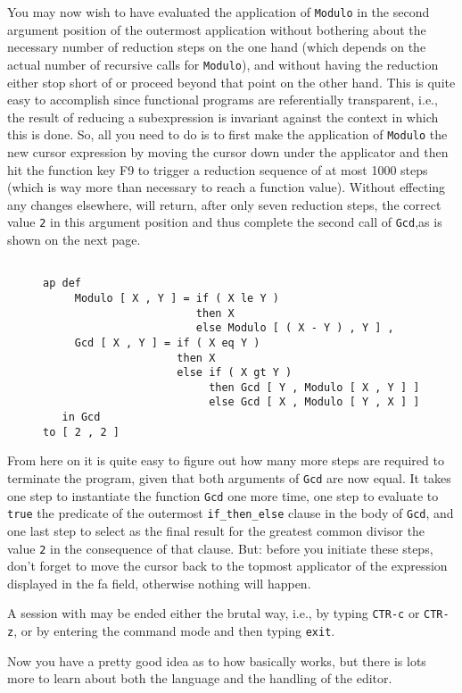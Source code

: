 You  may now wish to have evaluated 
the application of {\tt Modulo} in the second argument
position of the outermost application without bothering about the necessary
number of
reduction steps on the one hand (which depends on the actual number of
recursive calls for {\tt Modulo}), and without
having the reduction either stop short of or proceed beyond that point on the
other hand. This is quite easy to accomplish since functional programs are {\mys referentially 
transparent}, i.e., the result of reducing a subexpression
is invariant against the context in which this is done. So, all you need
to do is to first make the application of {\tt Modulo} the new cursor
expression by moving the cursor down under the applicator and then  hit
the function key F9 to trigger a reduction sequence of at most 1000 steps 
(which is way more than necessary to reach a function value). Without
effecting any changes elsewhere,
\pired will return, after only seven reduction steps, the correct value {\tt 2} in
 this argument position and thus complete the second call of {\tt Gcd},as is shown on the next page.

\begin{figure}
\begin{verbatim}

ap def 
     Modulo [ X , Y ] = if ( X le Y )
                        then X
                        else Modulo [ ( X - Y ) , Y ] ,
     Gcd [ X , Y ] = if ( X eq Y )
                     then X
                     else if ( X gt Y )
                          then Gcd [ Y , Modulo [ X , Y ] ]
                          else Gcd [ X , Modulo [ Y , X ] ]
   in Gcd
to [ 2 , 2 ]

\end{verbatim}
\end{figure}
From here on it is quite easy to figure out how many more steps are
required to terminate the program, given that both arguments of
{\tt Gcd} are now equal. It takes one step to instantiate
 the function {\tt Gcd}  one more time, one step to evaluate to {\tt true}
the predicate of the outermost {\tt if\_then\_else} clause in the body of
{\tt Gcd}, and one last step to select as the final result for the greatest
common divisor the value {\tt 2} in the consequence of that clause.
But: before you initiate these steps, don't forget to move the cursor
back to the topmost applicator of
 the expression displayed in the {\sc fa} field, otherwise nothing will happen.

 A session with \pired may be ended either the brutal way, i.e., by typing
{\tt CTR-c} or {\tt CTR-z}, or by entering the command mode and
 then typing {\tt exit}.

Now you have a pretty good idea as to how \pired basically works, but
 there is lots more to learn about both the
language \kir and the handling of the editor.

